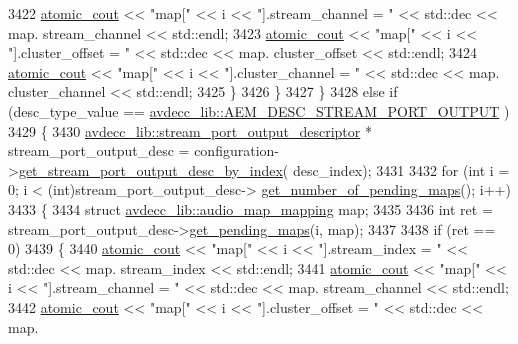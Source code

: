 \begin{DoxyCode}
3422                 \hyperlink{cmd__line_8h_a0bc38ccc65c79ba06c6fcd7b4bf554c3}{atomic\_cout} << \textcolor{stringliteral}{"map["} << i << \textcolor{stringliteral}{"].stream\_channel = "} << std::dec << map.
      stream\_channel << std::endl;
3423                 \hyperlink{cmd__line_8h_a0bc38ccc65c79ba06c6fcd7b4bf554c3}{atomic\_cout} << \textcolor{stringliteral}{"map["} << i << \textcolor{stringliteral}{"].cluster\_offset = "} << std::dec << map.
      cluster\_offset << std::endl;
3424                 \hyperlink{cmd__line_8h_a0bc38ccc65c79ba06c6fcd7b4bf554c3}{atomic\_cout} << \textcolor{stringliteral}{"map["} << i << \textcolor{stringliteral}{"].cluster\_channel = "} << std::dec << map.
      cluster\_channel << std::endl;
3425             \}
3426         \}
3427     \}
3428     \textcolor{keywordflow}{else} \textcolor{keywordflow}{if} (desc\_type\_value == \hyperlink{namespaceavdecc__lib_ac7b7d227e46bc72b63ee9e9aae15902fa2b2dca37bb2c945a2b37b02231650b48}{avdecc\_lib::AEM\_DESC\_STREAM\_PORT\_OUTPUT}
      )
3429     \{
3430         \hyperlink{classavdecc__lib_1_1stream__port__output__descriptor}{avdecc\_lib::stream\_port\_output\_descriptor} * 
      stream\_port\_output\_desc = configuration->\hyperlink{classavdecc__lib_1_1configuration__descriptor_afc0e79843f9b98263f9be9d16197310b}{get\_stream\_port\_output\_desc\_by\_index}(
      desc\_index);
3431 
3432         \textcolor{keywordflow}{for} (\textcolor{keywordtype}{int} i = 0; i < (int)stream\_port\_output\_desc->
      \hyperlink{classavdecc__lib_1_1stream__port__output__descriptor_ab97aa51efdb274b6226d04c41f2d974e}{get\_number\_of\_pending\_maps}(); i++)
3433         \{
3434             \textcolor{keyword}{struct }\hyperlink{structavdecc__lib_1_1audio__map__mapping}{avdecc\_lib::audio\_map\_mapping} map;
3435 
3436             \textcolor{keywordtype}{int} ret = stream\_port\_output\_desc->\hyperlink{classavdecc__lib_1_1stream__port__output__descriptor_aaa56e01b09f3ff3f29037216607e556e}{get\_pending\_maps}(i, map);
3437 
3438             \textcolor{keywordflow}{if} (ret == 0)
3439             \{
3440                 \hyperlink{cmd__line_8h_a0bc38ccc65c79ba06c6fcd7b4bf554c3}{atomic\_cout} << \textcolor{stringliteral}{"map["} << i << \textcolor{stringliteral}{"].stream\_index = "} << std::dec << map.
      stream\_index << std::endl;
3441                 \hyperlink{cmd__line_8h_a0bc38ccc65c79ba06c6fcd7b4bf554c3}{atomic\_cout} << \textcolor{stringliteral}{"map["} << i << \textcolor{stringliteral}{"].stream\_channel = "} << std::dec << map.
      stream\_channel << std::endl;
3442                 \hyperlink{cmd__line_8h_a0bc38ccc65c79ba06c6fcd7b4bf554c3}{atomic\_cout} << \textcolor{stringliteral}{"map["} << i << \textcolor{stringliteral}{"].cluster\_offset = "} << std::dec << map.

\end{DoxyCode}

